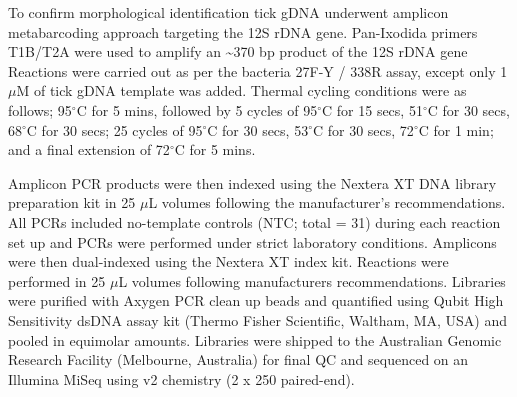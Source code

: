 \documentclass[a4paper, nobind]{templates/ociamthesis}
\begin{document}
To confirm morphological identification tick gDNA underwent amplicon metabarcoding approach targeting the 12S rDNA gene.
Pan-Ixodida primers T1B/T2A \autocite{beatiAnalysisSystematicRelationships2001} were used to amplify an \textasciitilde370 bp product of the 12S rDNA gene
Reactions were carried out as per the bacteria 27F-Y / 338R assay, except only 1 \(\mu\)M of tick gDNA template was added.
Thermal cycling conditions were as follows; 95\(^\circ\)C for 5 mins, followed by 5 cycles of 95\(^\circ\)C for 15 secs, 51\(^\circ\)C for 30 secs, 68\(^\circ\)C for 30 secs; 25 cycles of 95\(^\circ\)C for 30 secs, 53\(^\circ\)C for 30 secs, 72\(^\circ\)C for 1 min; and a final extension of 72\(^\circ\)C for 5 mins.

Amplicon PCR products were then indexed using the Nextera XT DNA library preparation kit in 25 \(\mu\)L volumes following the manufacturer's recommendations.
All PCRs included no-template controls (NTC; total = 31) during each reaction set up and PCRs were performed under strict laboratory conditions.
Amplicons were then dual-indexed using the Nextera XT index kit.
Reactions were performed in 25 \(\mu\)L volumes following manufacturers recommendations.
Libraries were purified with Axygen PCR clean up beads and quantified using Qubit High Sensitivity dsDNA assay kit (Thermo Fisher Scientific, Waltham, MA, USA) and pooled in equimolar amounts.
Libraries were shipped to the Australian Genomic Research Facility (Melbourne, Australia) for final QC and sequenced on an Illumina MiSeq using v2 chemistry (2 x 250 paired-end).
\end{document}

